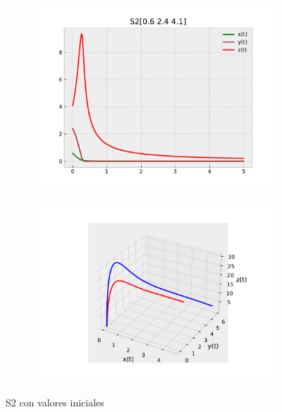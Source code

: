 \documentclass{wscpaperproc}
\theoremstyle{wsc}
\begin{document}
\begin{figure}[h]
	\centering
	\begin{subfigure}[b]{0.5\textwidth}
		\centering
		\includegraphics[width=\textwidth]{Simulations/S2[0.6 2.4 4.1].pdf}
	
		\label{fig:comparativa51}
	\end{subfigure}%
	\begin{subfigure}[b]{0.5\textwidth}
		\centering
		\includegraphics[width=\textwidth]{Simulations/S13d.pdf}
		\label{fig:comparativa52}
	\end{subfigure}
	\caption{S2 con valores iniciales}

	\label{fig:comparacion6}
\end{figure}
\end{document}
